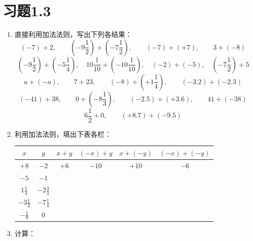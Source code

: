 \section*{习题1.3}

\begin{enumerate}
    \item 直接利用加法法则，写出下列各结果：
\[(-7)+2,\qquad \left(-9\frac{1}{2}\right)+\left(-7\frac{1}{2}\right),\qquad (-7)+(+7),\qquad 3+(-8)\]    
\[\left(-9\frac{1}{2}\right)+\left(-5\frac{1}{4}\right),\quad 10\frac{1}{10}+\left(-10\frac{1}{10}\right),\quad (-2)+(-5),\quad \left(-7\frac{1}{2}\right)+5 \]
\[a+(-a),\qquad 7+23,\qquad (-8)+\left(+1\frac{1}{4}\right),\qquad (-3.2)+(-2.3) \]
\[(-41)+38,\qquad 0+\left(-8\frac{1}{3}\right),\qquad (-2.5)+(+3.6),\qquad 41+(-38)\]
\[6\frac{1}{2}+0,\qquad (+8.7)+(-9.5) \]
    \item 利用加法法则，填出下表各栏：
\begin{center}
    \renewcommand{\arraystretch}{1.8}
    \begin{tabular}{c|c|c|c|c|c}
\hline
$x$& $y$&  $x+y$& $(-x)+y$& $x+(-y)$& $(-x)+(-y)$\\ 
\hline
$+8$ &$-2$&$+6$&$-10$&$+10$&$-6$\\
$-5$ & $-1$ \\
$1\frac{1}{4}$ & $-2\frac{3}{4}$ \\
$-3\frac{1}{2}$ & $-7\frac{1}{4}$ \\
$-\frac{1}{9}$ & $0$ \\
\hline
    \end{tabular}
\end{center}

\item 计算：
\begin{enumerate}
\end{enumerate}


\end{enumerate}
